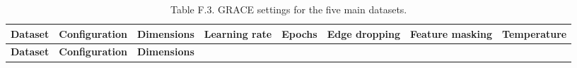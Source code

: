 \begin{longtable}[]{@{}
  >{\raggedright\arraybackslash}p{}
  >{\centering\arraybackslash}p{}
  >{\centering\arraybackslash}p{}
  >{\centering\arraybackslash}p{}
  >{\centering\arraybackslash}p{}
  >{\centering\arraybackslash}p{}
  >{\centering\arraybackslash}p{}
  >{\centering\arraybackslash}p{}@{}}
\caption{Table F.3. GRACE settings for the five main datasets.}\tabularnewline
\toprule\noalign{}
\begin{minipage}[b]{\linewidth}\raggedright
\textbf{Dataset}
\end{minipage} & \begin{minipage}[b]{\linewidth}\centering
\textbf{Configuration}
\end{minipage} & \begin{minipage}[b]{\linewidth}\centering
\textbf{Dimensions}
\end{minipage} & \begin{minipage}[b]{\linewidth}\centering
\textbf{Learning rate}
\end{minipage} & \begin{minipage}[b]{\linewidth}\centering
\textbf{Epochs}
\end{minipage} & \begin{minipage}[b]{\linewidth}\centering
\textbf{Edge dropping}
\end{minipage} & \begin{minipage}[b]{\linewidth}\centering
\textbf{Feature masking}
\end{minipage} & \begin{minipage}[b]{\linewidth}\centering
\textbf{Temperature}
\end{minipage} \\
\midrule\noalign{}
\endfirsthead
\toprule\noalign{}
\begin{minipage}[b]{\linewidth}\raggedright
\textbf{Dataset}
\end{minipage} & \begin{minipage}[b]{\linewidth}\centering
\textbf{Configuration}
\end{minipage} & \begin{minipage}[b]{\linewidth}\centering
\textbf{Dimensions}
\end{minipage} & \begin{minipage}[b]{\linewidth}\centering

\end{minipage}
\end{longtable}
